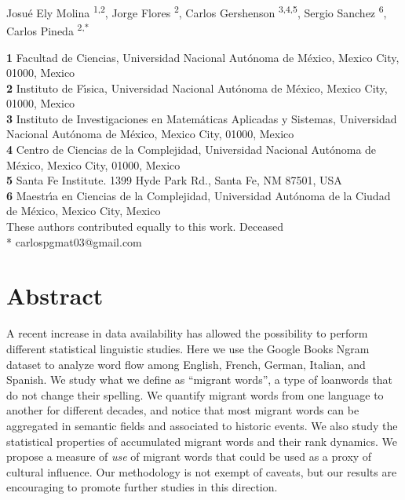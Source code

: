 \documentclass[10pt,letterpaper]{article} %
\begin{document}
\vspace*{0.2in}

\begin{flushleft}
{\Large
	\textbf{} %
}
\newline
Josué Ely Molina  \ddag\textsuperscript{1,2}, %
Jorge Flores      \dag \textsuperscript{2}, %
Carlos Gershenson \textsuperscript{3,4,5},
Sergio Sanchez    \textsuperscript{6},\\
Carlos Pineda     \ddag\textsuperscript{2,*}    %
% 


\bigskip
\newcommand{\unam}{Universidad Nacional Aut\'{o}noma de M\'{e}xico, Mexico City, 01000, Mexico}
\textbf{1} Facultad de Ciencias, \unam \\
\textbf{2} Instituto de F\'{\i}sica, \unam \\
\textbf{3} Instituto de Investigaciones en Matem\'{a}ticas Aplicadas y Sistemas, \unam \\
\textbf{4} Centro de Ciencias de la Complejidad, \unam \\
\textbf{5} Santa Fe Institute. 1399 Hyde Park Rd., Santa Fe, NM 87501, USA\\
\textbf{6} 
Maestr\'{\i}a en Ciencias de la Complejidad, 
Universidad Aut\'{o}noma de la Ciudad de M\'{e}xico,
Mexico City, Mexico
\\
\bigskip
\ddag These authors contributed equally to this work.
\dag Deceased \\
* carlospgmat03@gmail.com
\end{flushleft}
\section*{Abstract} %

A recent increase in data availability has allowed the possibility to perform different statistical linguistic studies. Here we use the Google Books Ngram dataset to analyze word flow among English, French, German, Italian, and Spanish. We study what we define as ``migrant words'', a type of loanwords that do not change their spelling. We quantify migrant words from one language to another for different decades, and notice that most migrant words can be aggregated in semantic fields and associated to historic events. We also study the statistical properties of accumulated migrant words and their rank dynamics. We propose a measure of \emph{use} of migrant words that could be used as a proxy of cultural influence. Our methodology is not exempt of caveats, but our results are encouraging to promote further studies in this direction.
\end{document}
